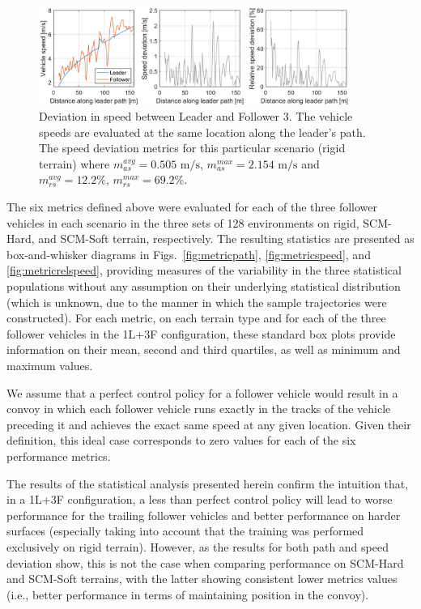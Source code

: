 \documentclass[12pt,twocolumn]{article}
\begin{document}
\begin{figure}
    \centering
    \includegraphics[width=0.9\textwidth]{Figs/Metrics/speed_deviation.png}
    \caption{Deviation in speed between Leader and Follower 3.  The vehicle speeds are evaluated at the same location along the leader's path. The speed deviation metrics for this particular scenario (rigid terrain) where $m_{as}^{avg} = 0.505 \text{ m/s}$, $m_{as}^{max} = 2.154 \text { m/s}$ and $m_{rs}^{avg} = 12.2 \%$, $m_{rs}^{max} = 69.2 \%$.}   
    \label{fig:metrics_speed_deviation}
\end{figure}



The six metrics defined above were evaluated for each of the three follower vehicles in each scenario in the three sets of 128 environments on rigid, SCM-Hard, and SCM-Soft terrain, respectively. The resulting statistics are presented as box-and-whisker diagrams in Figs.~\ref{fig:metricpath}, \ref{fig:metricspeed}, and \ref{fig:metricrelspeed}, providing measures of the variability in the three statistical populations without any assumption on their underlying statistical distribution (which is unknown, due to the manner in which the sample trajectories were constructed).  For each metric, on each terrain type and for each of the three follower vehicles in the 1L+3F configuration, these standard box plots provide information on their mean, second and third quartiles, as well as minimum and maximum values.

We assume that a perfect control policy for a follower vehicle would result in a convoy in which each follower vehicle runs exactly in the tracks of the vehicle preceding it and achieves the exact same speed at any given location.  Given their definition, this ideal case corresponds to zero values for each of the six performance metrics.  

The results of the statistical analysis presented herein confirm the intuition that, in a 1L+3F configuration, a less than perfect control policy will lead to worse performance for the trailing follower vehicles and better performance on harder surfaces (especially taking into account that the training was performed exclusively on rigid terrain).  However, as the results for both path and speed deviation show, this is not the case when comparing performance on SCM-Hard and SCM-Soft terrains, with the latter showing consistent lower metrics values (i.e., better performance in terms of maintaining position in the convoy). 
\end{document}
